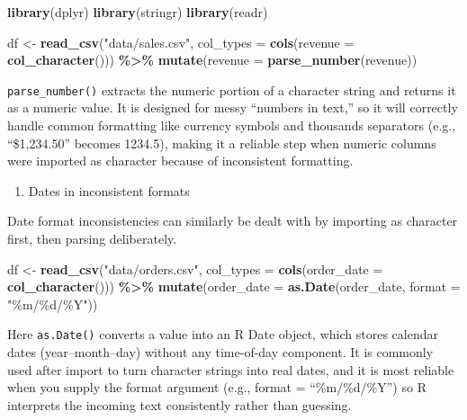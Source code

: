 \documentclass[
  11pt,
]{article}
\newenvironment{Shaded}{\begin{snugshade}}{\end{snugshade}}
\newcommand{\AttributeTok}[1]{\textcolor[rgb]{0.13,0.29,0.53}{#1}}
\newcommand{\FunctionTok}[1]{\textcolor[rgb]{0.13,0.29,0.53}{\textbf{#1}}}
\newcommand{\NormalTok}[1]{#1}
\newcommand{\OtherTok}[1]{\textcolor[rgb]{0.56,0.35,0.01}{#1}}
\newcommand{\SpecialCharTok}[1]{\textcolor[rgb]{0.81,0.36,0.00}{\textbf{#1}}}
\newcommand{\StringTok}[1]{\textcolor[rgb]{0.31,0.60,0.02}{#1}}
\providecommand{\tightlist}{%
  \setlength{\itemsep}{0pt}\setlength{\parskip}{0pt}}
\begin{document}
\begin{Shaded}
\begin{Highlighting}[]
\FunctionTok{library}\NormalTok{(dplyr)}
\FunctionTok{library}\NormalTok{(stringr)}
\FunctionTok{library}\NormalTok{(readr)}

\NormalTok{df }\OtherTok{\textless{}{-}} \FunctionTok{read\_csv}\NormalTok{(}\StringTok{"data/sales.csv"}\NormalTok{, }\AttributeTok{col\_types =} \FunctionTok{cols}\NormalTok{(}\AttributeTok{revenue =} \FunctionTok{col\_character}\NormalTok{())) }\SpecialCharTok{\%\textgreater{}\%}
  \FunctionTok{mutate}\NormalTok{(}\AttributeTok{revenue =} \FunctionTok{parse\_number}\NormalTok{(revenue))}
\end{Highlighting}
\end{Shaded}

\texttt{parse\_number()} extracts the numeric portion of a character
string and returns it as a numeric value. It is designed for messy
``numbers in text,'' so it will correctly handle common formatting like
currency symbols and thousands separators (e.g., ``\$1,234.50'' becomes
1234.5), making it a reliable step when numeric columns were imported as
character because of inconsistent formatting.

\begin{enumerate}
\def\labelenumi{\arabic{enumi}.}
\setcounter{enumi}{2}
\tightlist
\item
  Dates in inconsistent formats
\end{enumerate}

Date format inconsistencies can similarly be dealt with by importing as
character first, then parsing deliberately.

\begin{Shaded}
\begin{Highlighting}[]
\NormalTok{df }\OtherTok{\textless{}{-}} \FunctionTok{read\_csv}\NormalTok{(}\StringTok{"data/orders.csv"}\NormalTok{, }\AttributeTok{col\_types =} \FunctionTok{cols}\NormalTok{(}\AttributeTok{order\_date =} \FunctionTok{col\_character}\NormalTok{())) }\SpecialCharTok{\%\textgreater{}\%}
  \FunctionTok{mutate}\NormalTok{(}\AttributeTok{order\_date =} \FunctionTok{as.Date}\NormalTok{(order\_date, }\AttributeTok{format =} \StringTok{"\%m/\%d/\%Y"}\NormalTok{))}
\end{Highlighting}
\end{Shaded}

Here \texttt{as.Date()} converts a value into an R Date object, which
stores calendar dates (year--month--day) without any time-of-day
component. It is commonly used after import to turn character strings
into real dates, and it is most reliable when you supply the format
argument (e.g., format = ``\%m/\%d/\%Y'') so R interprets the incoming
text consistently rather than guessing.
\end{document}
